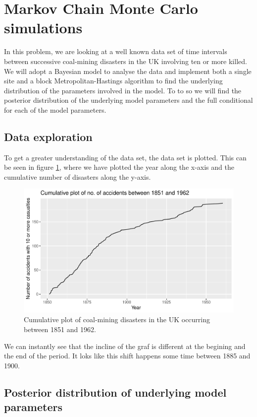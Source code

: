 \section{Markov Chain Monte Carlo simulations}

In this problem, we are looking at a well known data set of time intervals between successive coal-mining disasters in the UK involving ten or more killed. We will adopt a Bayesian model to analyse the data and implement both a single site and a block Metropolitan-Hastings algorithm to find the underlying distribution of the parameters involved in the model. To to so we will find the posterior distribution of the underlying model parameters and the full conditional for each of the model parameters. 

\subsection{Data exploration}
To get a greater understanding of the data set, the data set is plotted. This can be seen in figure \ref{fig:cumul_plot}, where we have plotted the year along the x-axis and the cumulative number of disasters along the y-axis. 

\begin{figure}[h]
    \centering
    \includegraphics[width = \textwidth]{Images/cumulative_plot_data.pdf}
    \caption{Cumulative plot of coal-mining disasters in the UK occurring between 1851 and 1962.}
    \label{fig:cumul_plot}
\end{figure}

We can instantly see that the incline of the graf is different at the begining and the end of the period. It loks like this shift happens some time between 1885 and 1900. 


\subsection{Posterior distribution of underlying model parameters} \label{posterior}

